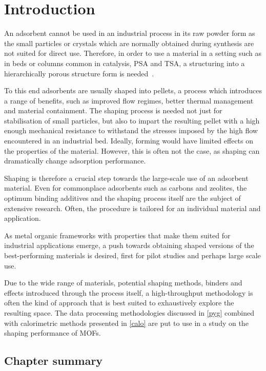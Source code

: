 
\section{Introduction}

An adsorbent cannot be used in an industrial process in its raw powder
form as the small particles or crystals which are normally obtained during
synthesis are not suited for direct use. Therefore, in order to use a 
material in a setting such 
as in beds or columns common in catalysis, \gls{PSA} and \gls{TSA},
a structuring into a hierarchically porous structure form is 
needed~\cite{akhtarStructuringAdsorbentsCatalysts2014}.

To this end adsorbents are usually shaped into pellets, a process
which introduces a range of benefits, such as improved flow regimes,
better thermal management and material containment. The shaping process
is needed not just for stabilisation of small particles, but also to
impart the resulting pellet with a high enough mechanical resistance 
to withstand the stresses imposed by the high flow encountered in 
an industrial bed. Ideally, forming would have limited effects on
the properties of the material. However, this is often not the case, 
as shaping can dramatically change adsorption performance.

Shaping is therefore a crucial step towards the large-scale
use of an adsorbent material. Even for commonplace adsorbents such as
carbons and zeolites, the optimum binding additives and the shaping
process itself are the subject of extensive research. Often, the
procedure is tailored for an individual material and application.

As metal organic frameworks with properties that make them suited 
for industrial applications emerge, a push towards obtaining shaped
versions of the best-performing materials is desired, first for 
pilot studies and perhaps large scale use.

Due to the wide range of materials, potential shaping methods, binders 
and effects introduced through the process itself, a high-throughput
methodology is often the kind of approach that is best suited to 
exhaustively explore the resulting space. The data processing methodologies
discussed in \autoref{pyg} combined with calorimetric methods
presented in \autoref{calo} are put to use in a study on the 
shaping performance of \glspl{MOF}.

\subsection*{Chapter summary}

